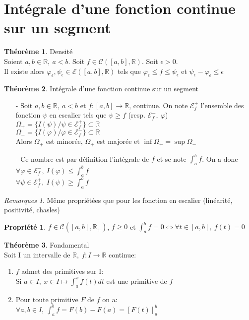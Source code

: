 \documentclass[fleqn]{article}
\theoremstyle{definition} \newtheorem*{defi}{D\'efinition}
\theoremstyle{definition} \newtheorem*{theo}{Th\'eor\`eme}
\theoremstyle{definition} \newtheorem*{coro}{Corollaire}
\theoremstyle{remark} \newtheorem*{rqs}{Remarques}
\theoremstyle{definition} \newtheorem*{prop}{Propri\'et\'e}
\begin{document}
\section{Int\'egrale d'une fonction continue sur un segment}
\begin{theo} Densit\'e \\
	Soient $a,b \in \mathbb{R},\ a < b$. Soit $f \in \mathscr{C}([a,b], \mathbb{R})$. Soit $\epsilon > 0$. \\
	Il existe alors $\varphi_{\epsilon}, \psi_{\epsilon} \in \mathcal{E}([a,b], \mathbb{R})$ tels que $\varphi_{\epsilon} \leq f
	\leq \psi_{\epsilon}$ et $\psi_{\epsilon} - \varphi_{\epsilon} \leq \epsilon$
\end{theo}

\begin{theo} Int\'egrale d'une fonction continue sur un segment
	\begin{itemize}
		\item [-] Soit $a,b \in \mathbb{R},\ a<b$ et $f:[a,b] \rightarrow \mathbb{R}$, continue. On note $\mathcal{E}_f^+$ l'ensemble des
		fonction $\psi$
			en escalier tels que $\psi \geq f$ (resp. $\mathcal{E}_f^-,\ \varphi$) \\
			$\Omega_+ = \{I(\psi) / \psi \in \mathcal{E}_f^+\} \subset \mathbb{R}$ \\
			$\Omega_- = \{I(\varphi) / \varphi \in \mathcal{E}_f^-\} \subset \mathbb{R}$ \\
			Alors $\Omega_+$ est minor\'ee, $\Omega_+$ est major\'ee et $\inf \Omega_+ = \sup \Omega_-$
		\item [-] Ce nombre est par d\'efinition l'int\'egrale de $f$ et se note $\int_a^b f$. On a donc\\
			$\forall \varphi \in \mathcal{E}_f^-,\ I(\varphi) \leq \int_a^b f$\\
			$\forall \psi \in \mathcal{E}_f^+,\ I(\psi) \geq \int_a^b f$
	\end{itemize}
\end{theo}

\begin{rqs} M\^eme propri\'et\'ees que pour les fonction en escalier (lin\'earit\'e, positivit\'e, chasles)
\end{rqs}

\begin{prop} $f \in \mathscr{C}([a,b], \mathbb{R}_+)$, $f \geq 0$ et $\int_a^b f = 0 \Leftrightarrow \forall t \in [a,b],\ f(t) = 0$
\end{prop}

\begin{theo} Fondamental \\
	Soit I un intervalle de $\mathbb{R},\ f:I\rightarrow \mathbb{R}$ continue:
	\begin{enumerate}
		\item $f$ admet des primitives sur I: \\
			Si $a \in I,\ x \in I \mapsto \int_a^x f(t)dt$ est une primitive de $f$
		\item Pour toute primitive $F$ de $f$ on a: \\
			$\forall a,b \in I,\ \int_a^b f = F(b) - F(a) = [F(t)]_a^b$
	\end{enumerate}
\end{theo}
\end{document}

